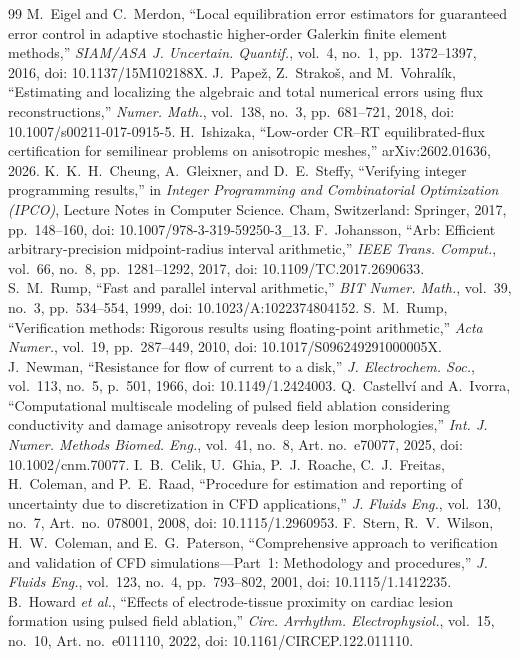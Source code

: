 \documentclass[11pt]{article}
\begin{document}
\begin{thebibliography}{99}
 M.~Eigel and C.~Merdon, ``Local equilibration error estimators for guaranteed error control in adaptive stochastic higher-order Galerkin finite element methods,'' \emph{SIAM/ASA J. Uncertain. Quantif.}, vol.~4, no.~1, pp.~1372--1397, 2016, doi: 10.1137/15M102188X.
 J.~Pape\v{z}, Z.~Strako\v{s}, and M.~Vohral\'ik, ``Estimating and localizing the algebraic and total numerical errors using flux reconstructions,'' \emph{Numer. Math.}, vol.~138, no.~3, pp.~681--721, 2018, doi: 10.1007/s00211-017-0915-5.
 H.~Ishizaka, ``Low-order CR--RT equilibrated-flux certification for semilinear problems on anisotropic meshes,'' arXiv:2602.01636, 2026.
 K.~K.~H.~Cheung, A.~Gleixner, and D.~E.~Steffy, ``Verifying integer programming results,'' in \emph{Integer Programming and Combinatorial Optimization (IPCO)}, Lecture Notes in Computer Science. Cham, Switzerland: Springer, 2017, pp.~148--160, doi: 10.1007/978-3-319-59250-3\_13.
 F.~Johansson, ``Arb: Efficient arbitrary-precision midpoint-radius interval arithmetic,'' \emph{IEEE Trans. Comput.}, vol.~66, no.~8, pp.~1281--1292, 2017, doi: 10.1109/TC.2017.2690633.
 S.~M.~Rump, ``Fast and parallel interval arithmetic,'' \emph{BIT Numer. Math.}, vol.~39, no.~3, pp.~534--554, 1999, doi: 10.1023/A:1022374804152.
 S.~M.~Rump, ``Verification methods: Rigorous results using floating-point arithmetic,'' \emph{Acta Numer.}, vol.~19, pp.~287--449, 2010, doi: 10.1017/S096249291000005X.
 J.~Newman, ``Resistance for flow of current to a disk,'' \emph{J. Electrochem. Soc.}, vol.~113, no.~5, p.~501, 1966, doi: 10.1149/1.2424003.
 Q.~Castellv\'i and A.~Ivorra, ``Computational multiscale modeling of pulsed field ablation considering conductivity and damage anisotropy reveals deep lesion morphologies,'' \emph{Int. J. Numer. Methods Biomed. Eng.}, vol.~41, no.~8, Art. no.~e70077, 2025, doi: 10.1002/cnm.70077.
 I.~B.~Celik, U.~Ghia, P.~J.~Roache, C.~J.~Freitas, H.~Coleman, and P.~E.~Raad, ``Procedure for estimation and reporting of uncertainty due to discretization in CFD applications,'' \emph{J. Fluids Eng.}, vol.~130, no.~7, Art.~no.~078001, 2008, doi: 10.1115/1.2960953.
 F.~Stern, R.~V.~Wilson, H.~W.~Coleman, and E.~G.~Paterson, ``Comprehensive approach to verification and validation of CFD simulations---Part~1: Methodology and procedures,'' \emph{J. Fluids Eng.}, vol.~123, no.~4, pp.~793--802, 2001, doi: 10.1115/1.1412235.
 B.~Howard \emph{et al.}, ``Effects of electrode-tissue proximity on cardiac lesion formation using pulsed field ablation,'' \emph{Circ. Arrhythm. Electrophysiol.}, vol.~15, no.~10, Art. no.~e011110, 2022, doi: 10.1161/CIRCEP.122.011110.

\end{thebibliography}
\end{document}
